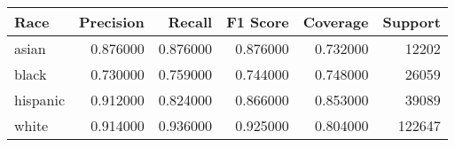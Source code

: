 \begin{tabular}{lrrrrr}
\toprule
Race & Precision & Recall & F1 Score & Coverage & Support \\
\midrule
asian & 0.876000 & 0.876000 & 0.876000 & 0.732000 & 12202 \\
black & 0.730000 & 0.759000 & 0.744000 & 0.748000 & 26059 \\
hispanic & 0.912000 & 0.824000 & 0.866000 & 0.853000 & 39089 \\
white & 0.914000 & 0.936000 & 0.925000 & 0.804000 & 122647 \\
\bottomrule
\end{tabular}
